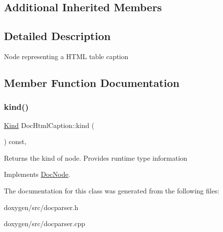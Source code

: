 \subsection*{Additional Inherited Members}


\subsection{Detailed Description}
Node representing a H\+T\+ML table caption 

\subsection{Member Function Documentation}
\mbox{\label{class_doc_html_caption_a12689a3aac71b8863b9a463fa958eb79}} 
\subsubsection{\texorpdfstring{kind()}{kind()}}
{\footnotesize\ttfamily \mbox{\hyperlink{class_doc_node_aebd16e89ca590d84cbd40543ea5faadb}{Kind}} Doc\+Html\+Caption\+::kind (\begin{DoxyParamCaption}{ }\end{DoxyParamCaption}) const\hspace{0.3cm}{\ttfamily [inline]}, {\ttfamily [virtual]}}

Returns the kind of node. Provides runtime type information 

Implements \mbox{\hyperlink{class_doc_node_a108ffd214a72ba6e93dac084a8f58049}{Doc\+Node}}.



The documentation for this class was generated from the following files\+:\begin{DoxyCompactItemize}
\item 
doxygen/src/docparser.\+h\item 
doxygen/src/docparser.\+cpp\end{DoxyCompactItemize}
